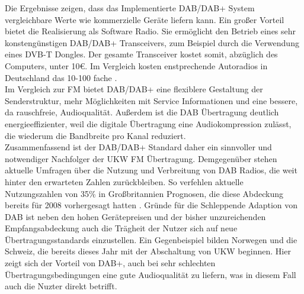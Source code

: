 Die Ergebnisse zeigen, dass das Implementierte DAB/DAB+ System vergleichbare Werte wie kommerzielle Geräte liefern kann. Ein großer Vorteil bietet die Realisierung als Software Radio. Sie ermöglicht den Betrieb eines sehr konstengünstigen DAB/DAB+ Transceivers, zum Beispiel durch die Verwendung eines DVB-T Dongles. Der gesamte Transceiver kostet somit, abzüglich des Computers, unter 10\euro. Im Vergleich kosten enstprechende Autoradios in Deutschland das 10-100 fache \cite{web:dab_im_auto}.\\

Im Vergleich zur FM bietet DAB/DAB+ eine flexiblere Gestaltung der Senderstruktur, mehr Möglichkeiten mit Service Informationen und eine bessere, da rauschfreie, Audioqualität. Außerdem ist die DAB Übertragung deutlich energieeffizienter, weil die digitale Übertragung eine Audiokompression zulässt, die wiederum die Bandbreite pro Kanal reduziert.\\
Zusammenfassend ist der DAB/DAB+ Standard daher ein sinnvoller und notwendiger Nachfolger der UKW FM Übertragung. Demgegenüber stehen aktuelle Umfragen über die Nutzung und Verbreitung von DAB Radios, die weit hinter den erwarteten Zahlen zurückbleiben. So verfehlen aktuelle Nutzungszahlen von 35\% \cite{web:dab_in_uk} in Großbritannien Prognosen, die diese Abdeckung bereits für 2008 vorhergesagt hatten \cite{dab:ausblick}. Gründe für die Schleppende Adaption von DAB ist neben den hohen Gerätepreisen und der bisher unzureichenden Empfangsabdeckung auch die Trägheit der Nutzer sich auf neue Übertragungsstandards einzustellen. Ein Gegenbeispiel bilden Norwegen und die Schweiz, die bereits dieses Jahr mit der Abschaltung von UKW beginnen. Hier zeigt sich der Vorteil von DAB+, auch bei sehr schlechten Übertragungsbedingungen eine gute Audioqualität zu liefern, was in diesem Fall auch die Nuzter direkt betrifft.